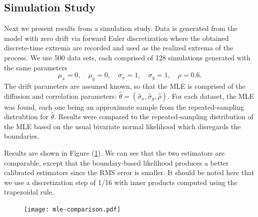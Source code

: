 \documentclass[10pt]{article}
\begin{document}
\subsection{Simulation Study}
Next we present results from a simulation study. Data is generated
from the model with zero drift via forward Euler discretization where
the obtained discrete-time extrema are recorded and used as the
realized extrema of the process. We use 500 data sets, each
comprised of 128 simulations generated with the same parameters
\[
  \mu_x = 0,\quad \mu_y  = 0,\quad \sigma_x = 1,\quad \sigma_y = 1,\quad \rho = 0.6.
\]
The drift parameters are assumed known, so that the MLE is comprised
of the diffusion and correlation parameters:
$\hat{\theta} = (\hat{\sigma}_x, \hat{\sigma}_y, \hat{\rho}).$ For
each dataset, the MLE was found, each one being an approximate sample
from the repeated-sampling distrubtion for $\hat{\theta}$. Results
were compared to the repeated-sampling distribution of the MLE based on the usual bivariate
normal likelihood which disregards the boundaries.

Results are shown in Figure (\ref{fig:mle-comparison}). We can see
that the two estimators are comparable, except that the boundary-based
likelihood produces a better calibrated estimators since the RMS error
is smaller. It should be noted here that we use a discretization step
of 1/16 with inner products computed using the trapezoidal rule. 

\begin{figure}
  \centering
  \texttt{[image: mle-comparison.pdf]}
  \caption{}
  \label{fig:mle-comparison}
\end{figure}



\end{document}
